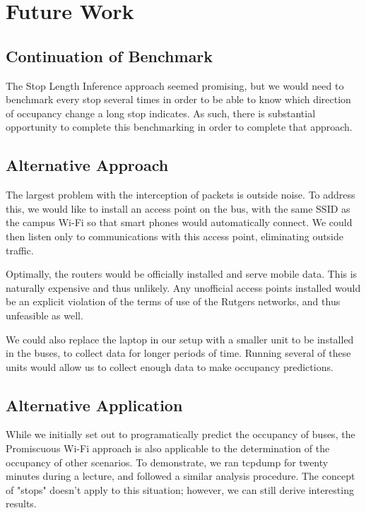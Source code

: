 \section{Future Work}

\subsection*{Continuation of Benchmark}
The Stop Length Inference approach seemed promising, but we would need to benchmark every stop several times in order to be able to know which direction of occupancy change a long stop indicates.
As such, there is substantial opportunity to complete this benchmarking in order to complete that approach.

\subsection*{Alternative Approach}
The largest problem with the interception of packets is outside noise.
To address this, we would like to install an access point on the bus, with the same SSID as the campus Wi-Fi so that smart phones would automatically connect.
We could then listen only to communications with this access point, eliminating outside traffic.
	
Optimally, the routers would be officially installed and serve mobile data.
This is naturally expensive and thus unlikely.
Any unofficial access points installed would be an explicit violation of the terms of use of the Rutgers networks, and thus unfeasible as well.

We could also replace the laptop in our setup with a smaller unit to be installed in the buses, to collect data for longer periods of time.
Running several of these units would allow us to collect enough data to make occupancy predictions.

\subsection*{Alternative Application}
While we initially set out to programatically predict the occupancy of buses, the Promiscuous Wi-Fi approach is also applicable to the determination of the occupancy of other scenarios.
To demonstrate, we ran tcpdump for twenty minutes during a lecture, and followed a similar analysis procedure.
The concept of "stops" doesn't apply to this situation; however, we can still derive interesting results.


